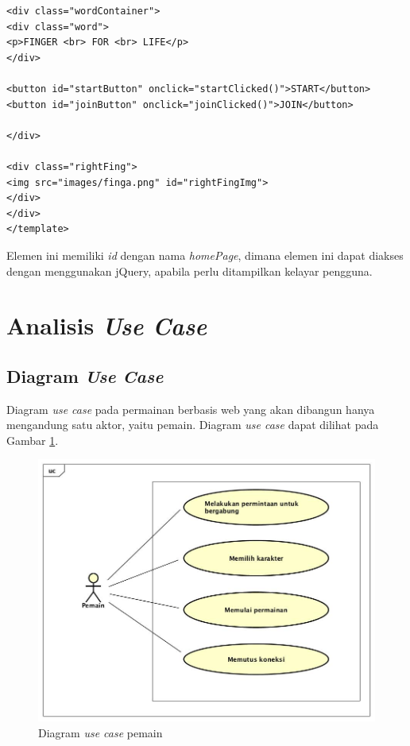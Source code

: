 \begin{enumerate}
\begin{lstlisting}[caption={Implementasi elemen <template>}]
<div class="wordContainer">
<div class="word">
<p>FINGER <br> FOR <br> LIFE</p>
</div>
	
<button id="startButton" onclick="startClicked()">START</button>
<button id="joinButton" onclick="joinClicked()">JOIN</button>
	
</div>
	
<div class="rightFing">
<img src="images/finga.png" id="rightFingImg">
</div>
</div>
</template>
\end{lstlisting}
Elemen ini memiliki \textit{id} dengan nama \textit{homePage}, dimana elemen ini dapat diakses dengan menggunakan jQuery, apabila perlu ditampilkan kelayar pengguna.

\end{enumerate}

\section{Analisis \textit{Use Case}}
\label{sec:usecase}

\subsection{Diagram \textit{Use Case}}
\label{subsec:diagram_usecase}

Diagram \textit{use case} pada permainan berbasis web yang akan dibangun hanya mengandung satu aktor, yaitu pemain. Diagram \textit{use case} dapat dilihat pada Gambar \ref{fig:usecase_pemain}.

\begin{figure}[H]
	\centering
	\includegraphics[scale=0.4]{Gambar/usecase_pemain}
	\caption{Diagram \textit{use case} pemain}
	\label{fig:usecase_pemain}
\end{figure}

